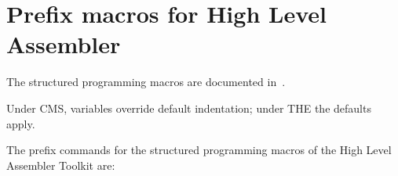 \documentclass[11pt]{article}
\begin{document}
\begin{description}

\end{description}

\section*{Prefix macros for High Level Assembler}

The structured programming macros are documented in~\cite{hlasmtk}.

Under CMS,  variables override default indentation; under THE the defaults apply.

\begin{description}
\item[{}] 
\item[{}] 
\item[{}] 
\item[{}] 
\item[{}] 
\item[{}] 
\item[{}] 
\end{description}
The prefix commands for the structured programming macros of the High Level Assembler Toolkit are:
\end{document}
